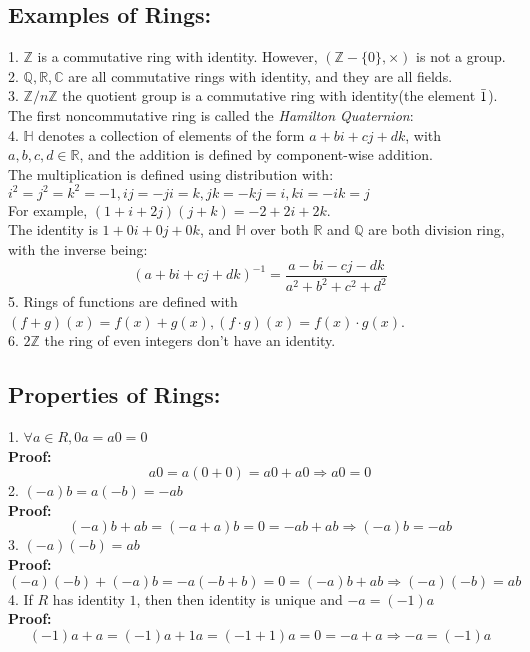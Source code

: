 \documentclass{article}
\begin{document}
\subsection{Examples of Rings:}
1. $\mathbb{Z}$ is a commutative ring with identity. However, $(\mathbb{Z}-\{0\}, \times)$ is not a group.\\
2. $\mathbb{Q}, \mathbb{R}, \mathbb{C}$ are all commutative rings with identity, and they are all fields.\\
3. $\mathbb{Z}/n\mathbb{Z}$ the quotient group is a commutative ring with identity(the element $\Bar{1}$).\\
The first noncommutative ring is called the \textit{Hamilton Quaternion}:\\
4. $\mathbb{H}$ denotes a collection of elements of the form $a+bi+cj+dk$, with $a,b,c,d \in \mathbb{R}$, and the addition is defined by component-wise addition.\\
The multiplication is defined using distribution with:\\
$i^2=j^2=k^2=-1, ij=-ji=k, jk=-kj=i, ki=-ik=j$\\
For example, $(1+i+2j)(j+k) = -2+2i+2k$.\\
The identity is $1+0i+0j+0k$, and $\mathbb{H}$ over both $\mathbb{R}$ and $\mathbb{Q}$ are both division ring, with the inverse being:\\
\begin{equation*}
    (a+bi+cj+dk)^{-1} = \frac{a-bi-cj-dk}{a^2+b^2+c^2+d^2}
\end{equation*}
5. Rings of functions are defined with $(f+g)(x) = f(x) + g(x), (f \cdot g)(x) = f(x) \cdot g(x)$.\\
6. $2\mathbb{Z}$ the ring of even integers don't have an identity.\\
\subsection{Properties of Rings:}
1. $\forall a \in R, 0a = a0 = 0$\\
\textbf{Proof:}
\begin{equation*}
    a0 = a(0+0) = a0 + a0 \Rightarrow a0 = 0
\end{equation*}
2. $(-a)b = a(-b) = -ab$\\
\textbf{Proof:}
\begin{equation*}
    (-a)b + ab = (-a+a)b = 0 = -ab + ab \Rightarrow (-a)b = -ab
\end{equation*}
3. $(-a)(-b) = ab$\\
\textbf{Proof:}
\begin{equation*}
    (-a)(-b) + (-a)b = -a(-b+b) = 0 = (-a)b + ab \Rightarrow (-a)(-b) = ab
\end{equation*}
4. If $R$ has identity $1$, then then identity is unique and $-a = (-1)a$\\
\textbf{Proof:}
\begin{equation*}
    (-1)a + a = (-1)a + 1a = (-1+1)a = 0 = -a + a \Rightarrow -a = (-1)a
\end{equation*}
\end{document}
